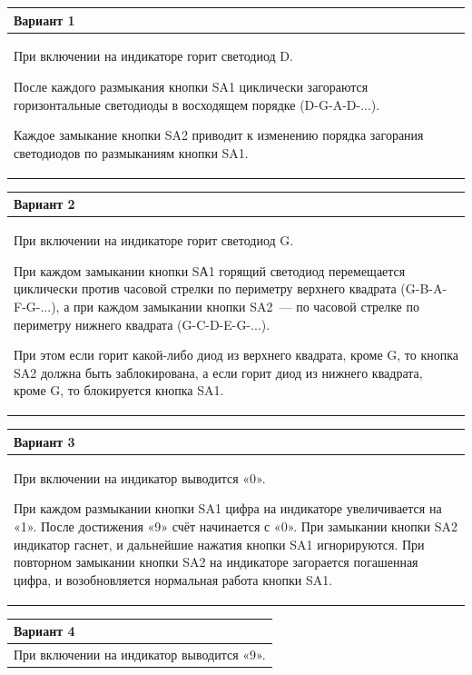 \documentclass[main.tex]{subfiles}
\begin{document}
\begin{small}

\vspace{12px}
\noindent
\begin{tabularx}{\textwidth}{|X|}
\hline
\textbf{Вариант 1}\\
\hline
При включении на индикаторе горит светодиод D.

После каждого размыкания кнопки SA1 циклически загораются горизонтальные светодиоды в восходящем порядке (D-G-A-D-...).

Каждое замыкание кнопки SA2 приводит к изменению порядка загорания светодиодов по размыканиям кнопки SA1.\\
\hline
\end{tabularx}

\vspace{6px}
\noindent
\begin{tabularx}{\textwidth}{|X|}
\hline
\textbf{Вариант 2}\\
\hline
При включении на индикаторе горит светодиод G.

При каждом замыкании кнопки SА1 горящий светодиод перемещается циклически против часовой стрелки по периметру верх­него квадрата (G-B-A-F-G-...), а при каждом замыкании кнопки SA2~--- по часовой стрелке по периметру нижнего квадрата (G-C-D-E-G-...).

При этом если горит какой-либо диод из верхнего квадрата, кроме G, то кнопка SA2 должна быть заблокирована, а если горит диод из нижнего квадрата, кроме G, то блокируется кнопка SA1.\\
\hline
\end{tabularx}

\vspace{6px}
\noindent 
\begin{tabularx}{\textwidth}{|X|}
\hline
\textbf{Вариант 3}\\
\hline
При включении на индикатор выводится «0».

При каждом размыкании кнопки SA1 цифра на индикаторе увеличивается на «1». После достижения «9» счёт начинается с «0». При замыкании кнопки SA2 индикатор гаснет, и дальнейшие нажатия кнопки SA1 игнорируются. При повторном замыкании кнопки SA2 на индикаторе загорается погашенная цифра, и воз­обновляется нормальная работа кнопки SA1.\\
\hline
\end{tabularx}

\vspace{6px}
\noindent 
\begin{tabularx}{\textwidth}{|X|}
\hline
\textbf{Вариант 4}\\
\hline
При включении на индикатор выводится «9».


\end{tabularx}
\end{small}
\end{document}
